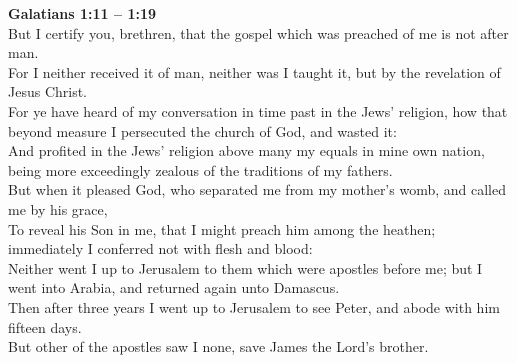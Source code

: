 \documentclass[10pt]{article} %
\begin{document}
{\begin{minipage}[t]{0.45\textwidth}
\textbf{Galatians 1:11 -- 1:19}\\
But I certify you, brethren, that the gospel which was preached of me is not after man.\\
For I neither received it of man, neither was I taught it, but by the revelation of Jesus Christ.\\
For ye have heard of my conversation in time past in the Jews' religion, how that beyond measure I persecuted the church of God, and wasted it:\\
And profited in the Jews' religion above many my equals in mine own nation, being more exceedingly zealous of the traditions of my fathers.\\
But when it pleased God, who separated me from my mother's womb, and called me by his grace,\\
To reveal his Son in me, that I might preach him among the heathen; immediately I conferred not with flesh and blood:\\
Neither went I up to Jerusalem to them which were apostles before me; but I went into Arabia, and returned again unto Damascus.\\
Then after three years I went up to Jerusalem to see Peter, and abode with him fifteen days.\\
But other of the apostles saw I none, save James the Lord's brother.\\
\end{minipage}}
\vspace*{\fill}
\newpage\Huge
\vspace*{\fill}
\singlespacing %
\vspace*{\fill}
\end{document}
